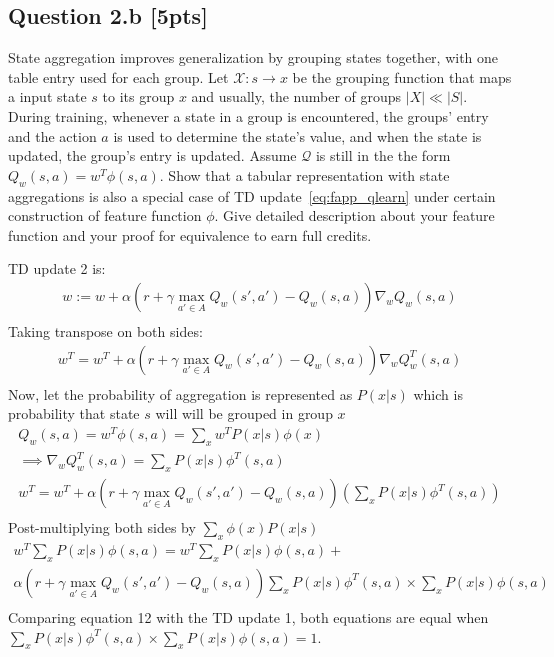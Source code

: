 \documentclass[12pt]{article}
\begin{document}
\subsection*{Question 2.b \textbf{[5pts]}}
State aggregation improves generalization by grouping states together, with one table entry used for each group. Let $\mathcal{X}: s \to x$ be the grouping function that maps a input state $s$ to its group $x$ and usually, the number of groups $|X| \ll |S|$. During training, whenever a state in a group is encountered, the groups' entry and the action $a$ is used to determine the state's value, and when the state is updated, the group's entry is updated. Assume $\mathcal Q$ is still in the the form $Q _w(s, a) = w ^T \phi(s, a)$. Show that a tabular representation with state aggregations is also a special case of TD update~\ref{eq:fapp_qlearn} under certain construction of feature function $\phi$. Give detailed description about your feature function and your proof for equivalence to earn full credits. 

\noindent

\begin{solution}
TD update 2 is:
\begin{align*}
w := w + 
		\alpha \left( 
			r + \gamma \max _{a' \in A} Q _w(s', a') 
				- Q _w(s, a) 
		\right) \nabla _w 
			Q _w (s, a) \\
\end{align*}
Taking transpose on both sides:
\begin{align*}
w^T = w^T + 
		\alpha \left( 
			r + \gamma \max _{a' \in A} Q _w(s', a') 
				- Q _w(s, a) 
		\right) \nabla _w 
			Q_w^T (s, a) \\
\end{align*}
Now, let the probability of aggregation is represented as $P(x|s)$ which is probability that state $s$ will will be grouped in group $x$
\begin{align*}
Q_w(s, a) = w ^T \phi(s, a) = \sum_x w ^T P(x|s) \phi(x)\\
\implies \nabla _w Q_w^T (s, a) = \sum_x P(x|s) \phi^T(s,a) \\
w^T = w^T + 
		\alpha \left( 
			r + \gamma \max _{a' \in A} Q _w(s', a') 
				- Q _w(s, a) 
		\right) (\sum_x P(x|s) \phi^T(s,a)) \\
\end{align*}
Post-multiplying both sides by $\sum_x\phi(x) P(x|s)$
\begin{align}
w^T \sum_x P(x|s) \phi(s,a) = w^T \sum_x P(x|s) \phi(s,a) + \nonumber \\ \nonumber
		\alpha \left(r + \gamma \max _{a' \in A} Q _w(s', a') - Q_w(s, a) \right) \sum_x P(x|s) \phi^T(s,a)\times \sum_x P(x|s) \phi(s,a) \\
\end{align}
Comparing equation 12 with the TD update 1, both equations are equal when $ \sum_x P(x|s) \phi^T(s,a)\times \sum_x P(x|s) \phi(s,a) = 1$.  
\end{solution}
\end{document}
